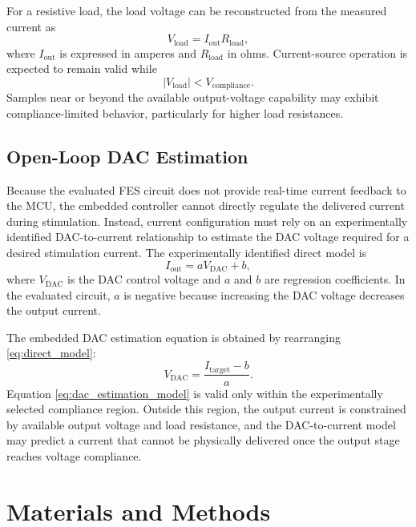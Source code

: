 \documentclass[conference]{IEEEtran}
\begin{document}
For a resistive load, the load voltage can be reconstructed from the measured current as
\begin{equation}
V_{\mathrm{load}} = I_{\mathrm{out}} R_{\mathrm{load}},
\label{eq:vload}
\end{equation}
where $I_{\mathrm{out}}$ is expressed in amperes and $R_{\mathrm{load}}$ in ohms. Current-source operation is expected to remain valid while
\begin{equation}
|V_{\mathrm{load}}| < V_{\mathrm{compliance}}.
\label{eq:compliance_condition}
\end{equation}
Samples near or beyond the available output-voltage capability may exhibit compliance-limited behavior, particularly for higher load resistances.

\subsection{Open-Loop DAC Estimation}

Because the evaluated FES circuit does not provide real-time current feedback to the MCU, the embedded controller cannot directly regulate the delivered current during stimulation. Instead, current configuration must rely on an experimentally identified DAC-to-current relationship to estimate the DAC voltage required for a desired stimulation current. The experimentally identified direct model is
\begin{equation}
I_{\mathrm{out}} = a V_{\mathrm{DAC}} + b,
\label{eq:direct_model}
\end{equation}
where $V_{\mathrm{DAC}}$ is the DAC control voltage and $a$ and $b$ are regression coefficients. In the evaluated circuit, $a$ is negative because increasing the DAC voltage decreases the output current.

The embedded DAC estimation equation is obtained by rearranging \eqref{eq:direct_model}:
\begin{equation}
V_{\mathrm{DAC}} = \frac{I_{\mathrm{target}} - b}{a}.
\label{eq:dac_estimation_model}
\end{equation}
Equation \eqref{eq:dac_estimation_model} is valid only within the experimentally selected compliance region. Outside this region, the output current is constrained by available output voltage and load resistance, and the DAC-to-current model may predict a current that cannot be physically delivered once the output stage reaches voltage compliance.

\section{Materials and Methods}
\end{document}

